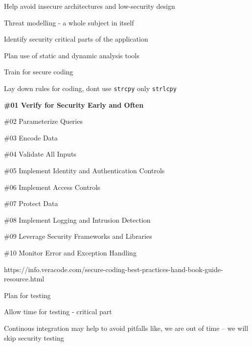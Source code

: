 \documentclass[Screen16to9,17pt]{foils}
\begin{document}
\begin{list2}
\item Help avoid insecure architectures and low-security design
\item Threat modelling - a whole subject in itself
\item Identify security critical parts of the application
\end{list2}


\begin{list2}
\item Plan use of static and dynamic analysis tools
\item Train for secure coding
\item Lay down rules for coding, dont use \verb+strcpy+ only \verb+strlcpy+
\end{list2}


\begin{list2}
\item {\bf \#01 Verify for Security Early and Often}
\item \#02 Parameterize Queries
\item \#03 Encode Data
\item \#04 Validate All Inputs
\item \#05 Implement Identity and
Authentication Controls
\item \#06 Implement Access Controls
\item \#07 Protect Data
\item \#08 Implement Logging
and Intrusion Detection
\item \#09 Leverage Security
Frameworks and Libraries
\item \#10 Monitor Error and Exception
Handling
\end{list2}

{https://info.veracode.com/secure-coding-best-practices-hand-book-guide-resource.html}




\begin{list2}
\item Plan for testing
\item Allow time for testing - critical part
\item Continous integration may help to avoid pitfalls like, we are out of time -- we will skip security testing
\end{list2}
\end{document}
